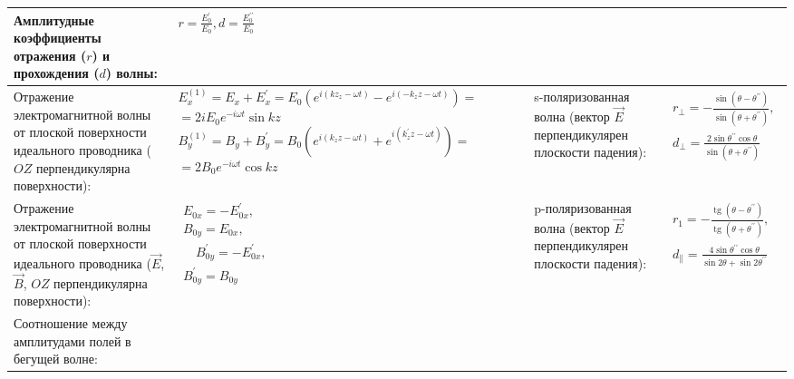 \documentclass{article}
\begin{document}
\begin{tabular}{ |p{5cm}|p{4.5cm}|p{6cm}|p{3.5cm}|  }
Амплитудные коэффициенты отражения ($r$) и прохождения ($d$) волны:        &
$r=\frac{E_{0}^{\prime}}{E_{0}}, d=\frac{E_{0}^{\prime \prime}}{E_{0}}$    \\
\hline
Отражение электромагнитной волны от плоской поверхности идеального проводника ($OZ$ перпендикулярна поверхности): &
$E_{x}^{(1)}=E_{x}+E_{x}^{\prime}=E_{0}\left(e^{i\left(k z_{z}-\omega t\right)}-e^{i\left(-k_{z} z-\omega t\right)}\right)=$
$=2 i E_{0} e^{-i \omega t} \sin k z$
$B_{y}^{(1)}=B_{y}+B_{y}^{\prime}=B_{0}\left(e^{i\left(k_{z} z-\omega t\right)}+e^{i\left(k_{z}^{\prime} z-\omega t\right)}\right)=$
$=2 B_{0} e^{-i \omega t} \cos k z$                                        &
s-поляризованная волна (вектор $\vec{E}$ перпендикулярен плоскости
 падения):                                                                 &
$\begin{aligned}
r_{\perp}=-\frac{\sin \left(\theta-\theta^{\prime \prime}\right)}{\sin \left(\theta+\theta^{\prime \prime}\right)}, \\
d_{\perp}=\frac{2 \sin \theta^{\prime \prime} \cos \theta}{\sin \left(\theta+\theta^{\prime \prime}\right)}
\end{aligned}$                                                              \\
\hline
Отражение электромагнитной волны от плоской поверхности идеального
 проводника ($\vec{E}$, $\vec{B}$, $OZ$ перпендикулярна поверхности):      &
$\begin{aligned}
E_{0 x}=-E_{0 x}^{\prime},                \\
B_{0 y}=E_{0 x},                          \\
\quad B_{0 y}^{\prime}=-E_{0 x}^{\prime}, \\
B_{0 y}^{\prime}=B_{0 y}
\end{aligned}$                                                             &
p-поляризованная волна (вектор $\vec{E}$ перпендикулярен плоскости
 падения):                                                                 &
$\begin{aligned}
r_{1}=-\frac{\operatorname{tg}\left(\theta-\theta^{\prime \prime}\right)}{\operatorname{tg}\left(\theta+\theta^{\prime \prime}\right)},  \\
d_{\|}=\frac{4 \sin \theta^{\prime \prime} \cos \theta}{\sin 2 \theta+\sin 2 \theta^{\prime \prime}}
\end{aligned}$ 
                                                                           \\
\hline
Соотношение между амплитудами полей в бегущей волне:                       &

\end{tabular}
\end{document}
